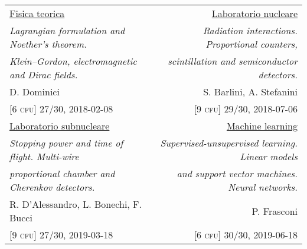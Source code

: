 \begin{tabular*}{\textwidth}{l @{\extracolsep{\fill}} r}
  {\ul {Fisica teorica}} & {\ul {Laboratorio nucleare}}\\
  {\small \emph {Lagrangian formulation and Noether's theorem.}} & {\small \emph {Radiation interactions. Proportional counters,}}\\
  {\small \emph {Klein--Gordon, electromagnetic and Dirac fields.}} & {\small \emph {scintillation and semiconductor detectors.}}\\
  {\small D. Dominici} & {\small S. Barlini, A. Stefanini}\\
  {\small [6 \textsc{cfu}] 27/30, 2018-02-08} & {\small [9 \textsc{cfu}] 29/30, 2018-07-06}\\ [3mm]

  {\ul {Laboratorio subnucleare}} & {\ul {Machine learning}}\\
  {\small \emph {Stopping power and time of flight. Multi-wire}} & {\small \emph {Supervised-unsupervised learning. Linear models}}\\
  {\small \emph {proportional chamber and Cherenkov detectors.}} & {\small \emph {and support vector machines. Neural networks.}}\\
  {\small R. D'Alessandro, L. Bonechi, F. Bucci} & {\small P. Frasconi}\\
  {\small [9 \textsc{cfu}] 27/30, 2019-03-18} & {\small [6 \textsc{cfu}] 30/30, 2019-06-18}
\end{tabular*}